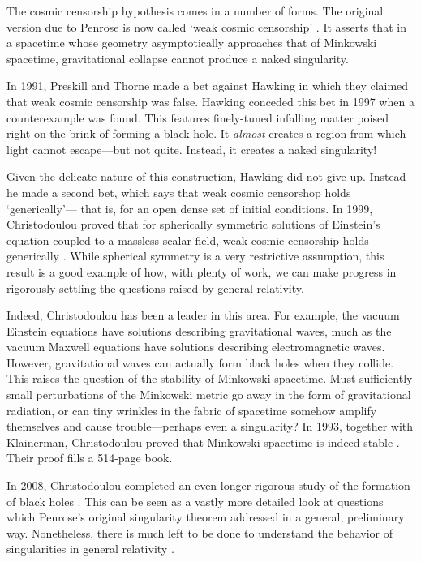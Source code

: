 \documentclass{article}
\begin{document}
The cosmic censorship hypothesis comes in a number of forms.    The original version due to Penrose is now called `weak cosmic censorship' \cite{Wald2008}.  It asserts that
in a spacetime whose geometry asymptotically approaches that of Minkowski spacetime, gravitational collapse cannot produce a naked singularity.   

In 1991, Preskill and Thorne made a bet against Hawking in which they claimed that weak cosmic censorship was false.  Hawking conceded this bet in 1997 when a counterexample was found.  This features finely-tuned infalling matter poised right on the brink of forming a black hole.   It \emph{almost} creates a region from which light cannot escape---but not quite.  Instead, it creates a naked singularity!

Given the delicate nature of this construction, Hawking did not give up.  Instead
he made a second bet, which says that weak cosmic censorshop holds `generically'---
that is, for an open dense set of initial conditions.  In 1999, Christodoulou proved that for spherically symmetric solutions of Einstein's equation coupled to a massless scalar field, weak cosmic censorship holds generically \cite{Christodoulou1999}.  While spherical symmetry is a very restrictive assumption, this result is a good example of how, with plenty of work, we can make progress in rigorously settling the questions raised by general relativity.

Indeed, Christodoulou has been a leader in this area.   For example, the vacuum Einstein equations have solutions describing gravitational waves, much as the vacuum Maxwell equations have solutions describing electromagnetic waves.  However, gravitational waves can actually form black holes when they collide.  This raises the question of the stability of Minkowski spacetime.  Must sufficiently small perturbations of the Minkowski metric go away in the form of gravitational radiation, or can tiny wrinkles in the fabric of spacetime somehow amplify themselves and cause trouble---perhaps even a singularity?   In 1993, together with Klainerman, Christodoulou proved that Minkowski spacetime is indeed stable \cite{CK}.  Their proof fills a 514-page book.

In 2008, Christodoulou completed an even longer rigorous study of the formation of black holes \cite{Christodoulou2008}.  This can be seen as a vastly more detailed look at questions which Penrose's original singularity theorem addressed in a general, preliminary way.  Nonetheless, there is much left to be done to understand the behavior of singularities in general relativity \cite{Rendall}.
\end{document}
